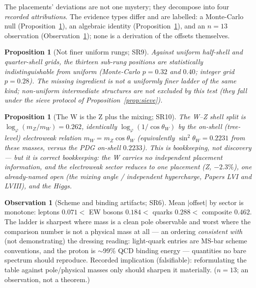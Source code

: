 \documentclass[12pt]{article}
\newtheorem{proposition}[theorem]{Proposition}
\theoremstyle{definition}
\newtheorem{observation}[theorem]{Observation}
\theoremstyle{remark}
\begin{document}
The placements' deviations are not one mystery; they decompose into four \emph{recorded attributions}. The evidence types differ and are labelled: a Monte-Carlo null (Proposition~\ref{prop:finer}), an algebraic identity (Proposition~\ref{prop:WZ}), and an $n=13$ observation (Observation~\ref{obs:scheme}); none is a derivation of the offsets themselves.

\begin{proposition}[Not finer uniform rungs; SR9]\label{prop:finer}
Against uniform half-shell and quarter-shell grids, the thirteen sub-rung positions are statistically indistinguishable from uniform (Monte-Carlo $p = 0.32$ and $0.40$; integer grid $p = 0.28$). The missing ingredient is not a uniformly finer ladder of the same kind; non-uniform intermediate structures are not excluded by this test (they fall under the sieve protocol of Proposition~\ref{prop:sieve}).
\end{proposition}

\begin{proposition}[The W is the Z plus the mixing; SR10]\label{prop:WZ}
The W--Z shell split is $\log_\varphi(m_Z/m_W) = 0.262$, identically $\log_\varphi(1/\cos\theta_W)$ by the on-shell (tree-level) electroweak relation $m_W = m_Z\cos\theta_W$ (equivalently $\sin^2\theta_W = 0.2231$ from these masses, versus the PDG on-shell $0.2233$). This is bookkeeping, not discovery --- but it is correct bookkeeping: the W carries no independent placement information, and the electroweak sector reduces to \emph{one} placement (Z, $-2.3\%$), one already-named open (the mixing angle / independent hypercharge, Papers LVI \citep{SmartLVI} and LVIII), and the Higgs.
\end{proposition}

\begin{observation}[Scheme and binding artifacts; SR6]\label{obs:scheme}
Mean $|$offset$|$ by sector is monotone: leptons $0.071 <$ EW bosons $0.184 <$ quarks $0.288 <$ composite $0.462$. The ladder is sharpest where mass is a clean pole observable and worst where the comparison number is not a physical mass at all --- an ordering \emph{consistent with} (not demonstrating) the dressing reading: light-quark entries are MS-bar scheme conventions, and the proton is $\sim$99\% QCD binding energy --- quantities no bare spectrum should reproduce. Recorded implication (falsifiable): reformulating the table against pole/physical masses only should sharpen it materially. ($n = 13$; an observation, not a theorem.)
\end{observation}
\end{document}

